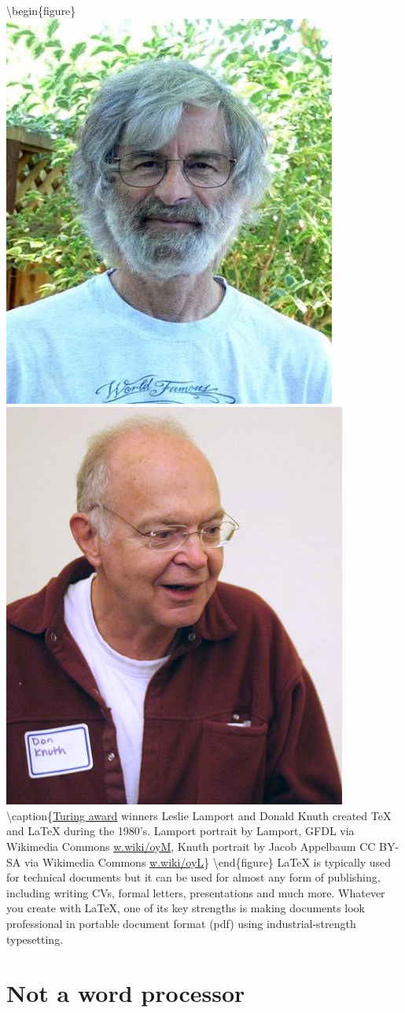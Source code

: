 \documentclass[
]{book}
\begin{document}
\textbackslash begin\{figure\}
\includegraphics[width=0.47\linewidth]{images/Leslie_Lamport} \includegraphics[width=0.47\linewidth]{images/KnuthAtOpenContentAlliance} \textbackslash caption\{\href{https://en.wikipedia.org/wiki/Turing_Award}{Turing award} winners Leslie Lamport and Donald Knuth created TeX and LaTeX during the 1980's. Lamport portrait by Lamport, GFDL via Wikimedia Commons \href{https://w.wiki/oyM}{w.wiki/oyM}, Knuth portrait by Jacob Appelbaum CC BY-SA via Wikimedia Commons \href{https://w.wiki/oyL}{w.wiki/oyL}\}\label{fig:knuthport-fig}
\textbackslash end\{figure\}
LaTeX is typically used for technical documents but it can be used for almost any form of publishing, including writing CVs, formal letters, presentations and much more. Whatever you create with LaTeX, one of its key strengths is making documents look professional in portable document format (pdf) using industrial-strength typesetting.

\hypertarget{not-a-word-processor}{%
\section{Not a word processor}\label{not-a-word-processor}}
\end{document}
